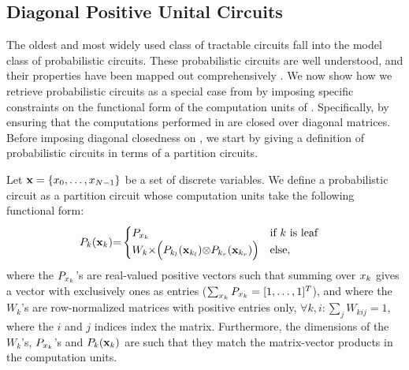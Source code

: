 \subsection{Diagonal Positive Unital Circuits}
\label{sec:diagcircuits}

The oldest and most widely used class of tractable circuits fall into the model class of probabilistic circuits. These probabilistic circuits are well understood, and their properties have been mapped out comprehensively \citep{vergari2021compositional}. We now show how we retrieve probabilistic circuits as a special case from \puncs by imposing specific constraints on the functional form of the computation units of \puncs. Specifically, by ensuring that the computations performed in \puncs are closed over diagonal matrices. Before imposing diagonal closedness on \puncs, we start by giving a definition of probabilistic circuits in terms of a partition circuits.




\begin{definition}
	\label{def:sdprobabilisticcircuit}
	Let   $\mathbf{x} = \{x_0, \allowbreak \dots ,\allowbreak x_{N{-}1}  \}$ be a set of discrete variables.
	We define a probabilistic circuit as a partition circuit whose computation units take the following functional form:
	\begin{align}
		 & {P}_k(\mathbf{x}_k){=}
		\begin{cases}
			P_{x_k}
			 & \text{if $k$ is leaf}
			\\
			W_k {\times} \Bigl(P_{k_l}(\mathbf{x}_{k_l}) {\otimes} P_{k_r}(\mathbf{x}_{k_r}) \Bigr)
			 & \text{else},
		\end{cases}
		\nonumber
	\end{align}
	where the  $P_{x_k}$'s are real-valued positive vectors such that summing over $x_k$ gives a vector with exclusively ones as entries ($\sum_{x_k} P_{x_k}= [ 1, \dots, 1 ]^T$), and where the $W_k$'s are row-normalized matrices with positive entries only, \ie $\forall k,i: \sum_j W_{kij}=1$, where the $i$ and $j$ indices index the matrix. Furthermore, the dimensions of the $W_k$'s, $P_{x_k}$'s and $P_k(\mathbf{x}_k)$ are such that they match the matrix-vector products in the computation units.
\end{definition}





